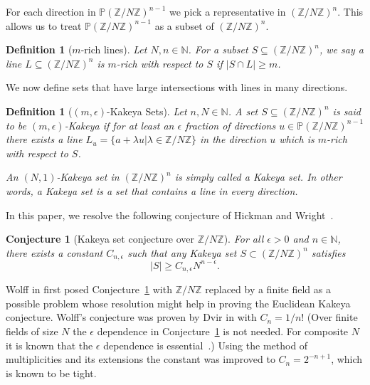 \documentclass[11pt]{article}
\numberwithin{equation}{section}
\newtheorem{define}[thm]{Definition}
\newtheorem{conjecture}[thm]{Conjecture}
\def\Z{{\mathbb{Z}}}
\def\N{{\mathbb{N}}}
\def\P{{\mathbb{P}}}
\newcommand{\eps}{\epsilon}
\begin{document}
For each direction in $\P (\Z/N\Z)^{n-1}$ we pick a representative in $(\Z/N\Z)^n$. This allows us to treat $\P (\Z/N\Z)^{n-1}$ as a subset of $(\Z/N\Z)^n$. 



\begin{define}[$m$-rich lines]
Let $N,n\in \N$. For a subset $S\subseteq (\Z/N\Z)^n$, we say a line $L\subseteq (\Z/N\Z)^n$ is $m$-rich with respect to $S$ if $|S\cap L|\ge m$.
\end{define}

We now define sets that have large intersections with lines in many directions.

\begin{define}[$(m,\epsilon)$-Kakeya Sets]
Let $n,N\in \N$. A set $S\subseteq (\Z/N\Z)^n$ is said to be $(m,\epsilon)$-Kakeya if for at least an $\epsilon$ fraction of directions $u\in \P (\Z/N\Z)^{n-1}$ there exists a line $L_u=\{a+\lambda u| \lambda \in \Z/N\Z\}$ in the direction $u$ which is $m$-rich with respect to $S$.

An $(N,1)$-Kakeya set in $(\Z/N\Z)^n$ is simply called a Kakeya set. In other words, a Kakeya set is a set that contains a line in every direction. 
\end{define}

In this paper, we resolve the following conjecture of Hickman and Wright~\cite{hickman2018fourier}.

\begin{conjecture}[Kakeya set conjecture over $\Z/N\Z$]\label{conj}
For all $\eps > 0$ and $n\in \N$, there exists a constant $C_{n,\eps}$ such that any Kakeya set $S \subset (\Z/N\Z)^n$ satisfies 
$$ |S| \geq C_{n,\epsilon} N^{n-\eps}.$$
\end{conjecture}

Wolff in \cite{wolf1999} first posed Conjecture~\ref{conj} with $\Z/N\Z$ replaced by a finite field as a possible problem whose resolution might help in proving the Euclidean Kakeya conjecture. Wolff's conjecture was proven by Dvir in \cite{dvir2009size} with $C_{n}=1/n!$ (Over finite fields of size $N$ the $\epsilon$ dependence in Conjecture~\ref{conj} is not needed. For composite $N$ it is known that the $\epsilon$ dependence is essential~\cite{hickman2018fourier,dhar2021proof}.) Using the method of multiplicities and its extensions \cite{saraf2008,dvir2013extensions,bukh2021sharp} the constant was improved to $C_{n}=2^{-n+1}$, which is known to be tight. 
\end{document}
